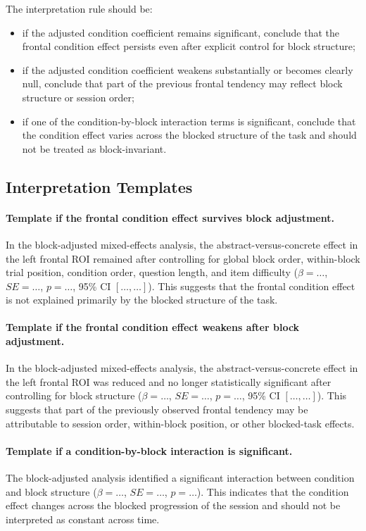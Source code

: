 The interpretation rule should be:
\begin{itemize}
    \item if the adjusted condition coefficient remains significant, conclude that the frontal
    condition effect persists even after explicit control for block structure;
    \item if the adjusted condition coefficient weakens substantially or becomes clearly null,
    conclude that part of the previous frontal tendency may reflect block structure or session order;
    \item if one of the condition-by-block interaction terms is significant, conclude that the
    condition effect varies across the blocked structure of the task and should not be treated
    as block-invariant.
\end{itemize}

\subsection{Interpretation Templates}

\paragraph{Template if the frontal condition effect survives block adjustment.}
In the block-adjusted mixed-effects analysis, the abstract-versus-concrete effect in the left frontal ROI
remained after controlling for global block order, within-block trial position, condition order,
question length, and item difficulty
(\(\beta=\ldots\), \(SE=\ldots\), \(p=\ldots\), 95\% CI \([\ldots,\ldots]\)).
This suggests that the frontal condition effect is not explained primarily by the blocked structure
of the task.

\paragraph{Template if the frontal condition effect weakens after block adjustment.}
In the block-adjusted mixed-effects analysis, the abstract-versus-concrete effect in the left frontal ROI
was reduced and no longer statistically significant after controlling for block structure
(\(\beta=\ldots\), \(SE=\ldots\), \(p=\ldots\), 95\% CI \([\ldots,\ldots]\)).
This suggests that part of the previously observed frontal tendency may be attributable to session order,
within-block position, or other blocked-task effects.

\paragraph{Template if a condition-by-block interaction is significant.}
The block-adjusted analysis identified a significant interaction between condition and block structure
(\(\beta=\ldots\), \(SE=\ldots\), \(p=\ldots\)).
This indicates that the condition effect changes across the blocked progression of the session and
should not be interpreted as constant across time.

